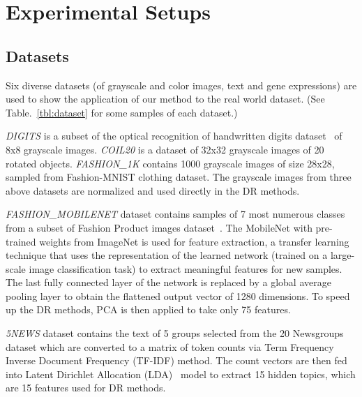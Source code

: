 
\section{Experimental Setups}


\subsection{Datasets}

Six diverse datasets (of grayscale and color images, text and gene expressions) are used to show the application of our method to the real world dataset. (See Table.~\ref{tbl:dataset} for some samples of each dataset.)

\emph{DIGITS} is a subset of the optical recognition of handwritten digits dataset~\cite{kaynak1995methods} of 8x8 grayscale images.
\emph{COIL20} \cite{nene1996} is a dataset of 32x32 grayscale images of 20 rotated objects.
\emph{FASHION\_1K} contains 1000 grayscale images of size 28x28, sampled from Fashion-MNIST\cite{xiao2017/online} clothing dataset.
The grayscale images from three above datasets are normalized and used directly in the DR methods.

\emph{FASHION\_MOBILENET} dataset contains samples of 7 most numerous classes from a subset of Fashion Product images dataset~\cite{fashionproduct}.
The MobileNet\cite{howard2017mobilenets} with pre-trained weights from ImageNet is used for feature extraction, a transfer learning technique that uses the representation of the learned network (trained on a large-scale image classification task) to extract meaningful features for new samples.
The last fully connected layer of the network is replaced by a global average pooling layer\cite[Sec.3.2]{lin2013network} to obtain the flattened output vector of 1280 dimensions.
To speed up the DR methods, PCA is then applied to take only 75 features.

\emph{5NEWS} dataset contains the text of 5 groups selected from the 20 Newsgroups dataset which are converted to a matrix of token counts via Term Frequency Inverse Document Frequency (TF-IDF) method.
The count vectors are then fed into Latent Dirichlet Allocation (LDA)~\cite{blei2003latent} model to extract 15 hidden topics, which are 15 features used for DR methods.

